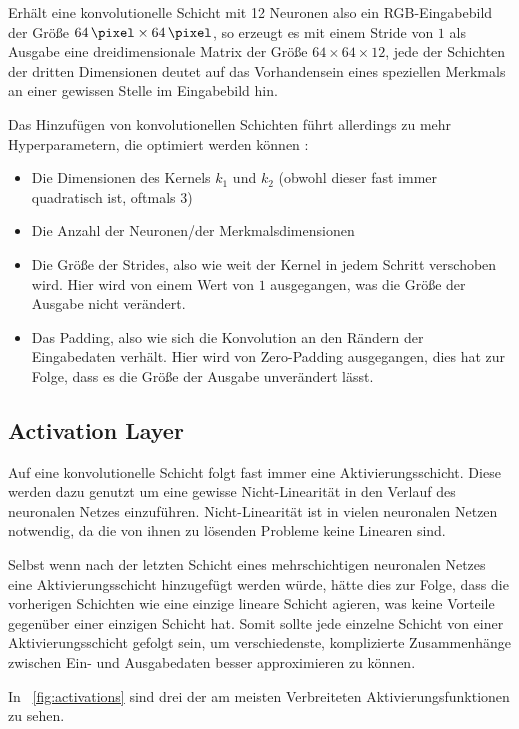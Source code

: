 Erhält eine konvolutionelle Schicht mit 12 Neuronen also \bspw ein RGB-Eingabebild der Größe $\SI{64}{\pixel}\times\SI{64}{\pixel}$, so erzeugt es mit einem Stride von $1$ als Ausgabe eine dreidimensionale Matrix der Größe $64\times64\times12$, jede der Schichten der dritten Dimensionen deutet auf das Vorhandensein eines speziellen Merkmals an einer gewissen Stelle im Eingabebild hin.

Das Hinzufügen von konvolutionellen Schichten führt allerdings zu mehr Hyperparametern, die optimiert werden können \cite{cs231n}:
\begin{itemize}
	\item Die Dimensionen des Kernels $k_1$ und $k_2$ (obwohl dieser fast immer quadratisch ist, oftmals $3$)
	\item Die Anzahl der Neuronen/der Merkmalsdimensionen
	\item Die Größe der Strides, also wie weit der Kernel in jedem Schritt verschoben wird. Hier wird von einem Wert von $1$ ausgegangen, was die Größe der Ausgabe nicht verändert.
	\item Das Padding, also wie sich die Konvolution an den Rändern der Eingabedaten verhält. Hier wird von Zero-Padding ausgegangen, dies hat zur Folge, dass es die Größe der Ausgabe unverändert lässt.
\end{itemize}

\subsection{Activation Layer}
\label{ssec:activation}

Auf eine konvolutionelle Schicht folgt fast immer eine Aktivierungsschicht. Diese werden dazu genutzt um eine gewisse Nicht-Linearität in den Verlauf des neuronalen Netzes einzuführen. Nicht-Linearität ist in vielen neuronalen Netzen notwendig, da die von ihnen zu lösenden Probleme keine Linearen sind. \cite[Kap.~6]{deeplearning_16}

Selbst wenn nach der letzten Schicht eines mehrschichtigen neuronalen Netzes eine Aktivierungsschicht hinzugefügt werden würde, hätte dies zur Folge, dass die vorherigen Schichten wie eine einzige lineare Schicht agieren, was keine Vorteile gegenüber einer einzigen Schicht hat. Somit sollte jede einzelne Schicht von einer Aktivierungsschicht gefolgt sein, um verschiedenste, komplizierte Zusammenhänge zwischen Ein- und Ausgabedaten besser approximieren zu können.

In \figurename~\ref{fig:activations} sind drei der am meisten Verbreiteten Aktivierungsfunktionen zu sehen.

